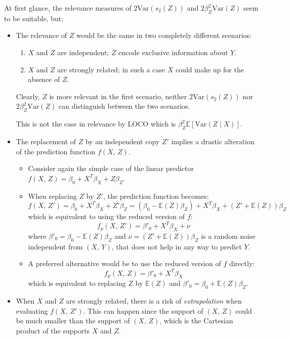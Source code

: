 At first glance, the relevance measures of $2\text{Var}(s_2(Z))$ and $2\beta_Z^2 \text{Var}(Z)$
seem to be suitable, but:
\begin{itemize}
	\item The relevance of $Z$ would be the same in two completely different scenarios:
	      \begin{enumerate}
		      \item $X$ and $Z$ are independent; $Z$ encode exclusive information about $Y$.
		      \item $X$ and $Z$ are strongly related; in such a case $X$ could make up for the
		            absence of $Z$.
	      \end{enumerate}
	      Clearly, $Z$ is more relevant in the first scenario, neither
	      $2\text{Var}(s_2(Z))$ nor $2\beta_Z^2 \text{Var}(Z)$ can distinguish between the two scenarios.
	      \begin{note}
		      This is not the case in relevance by LOCO which
		      is $\beta_Z^2 \mathds{E} \left[ \text{Var}(Z \mid X)\right]$.
	      \end{note}
	\item The replacement of $Z$ by an independent copy $Z'$ implies a drastic alteration
	      of the prediction function $f(X,\,Z)$.
	      \begin{itemize}
		      \item Consider again the simple case of the linear predictor
		            $f(X,\,Z) = \beta_0 + X^T\beta_X + Z\beta_Z$.
		      \item When replacing $Z$ by $Z'$, the prediction function becomes:
		            \begin{equation*}
			            f(X,\,Z') = \beta_0 + X^T\beta_X + Z'\beta_Z =
			            (\beta_0 - \mathds{E}(Z)\beta_Z) + X^T\beta_X + (Z' + \mathds{E}(Z))\beta_Z
		            \end{equation*}
		            which is equivalent to using the reduced version of $f$:
		            \begin{equation*}
			            f_p(X,\,Z') = \beta'_0 + X^T\beta_X + \nu
		            \end{equation*}
		            where $\beta'_0 = \beta_0 - \mathds{E}(Z)\beta_Z$ and $\nu = (Z' + \mathds{E}(Z))\beta_Z$ is
		            a random noise independent from $(X,\,Y)$, that does not help in any way to predict $Y$.
		      \item A preferred alternative would be to use the reduced version of $f$ directly:
		            \begin{equation*}
			            f_p(X,\,Z) = \beta'_0 + X^T\beta_X
		            \end{equation*}
		            which is equivalent to replacing $Z$ by $\mathds{E}(Z)$ and
		            $\beta'_0 = \beta_0 + \mathds{E}(Z)\beta_Z$.
	      \end{itemize}
	\item When $X$ and $Z$ are strongly related, there is a risk of
	      \emph{extrapolation} when evaluating $f(X,\,Z')$. This can happen since
	      the support of
	      $(X,\,Z)$ could be much smaller than the support of $(X,\,Z)$, which
	      is the Cartesian product of the supports $X$ and $Z$.
\end{itemize}

